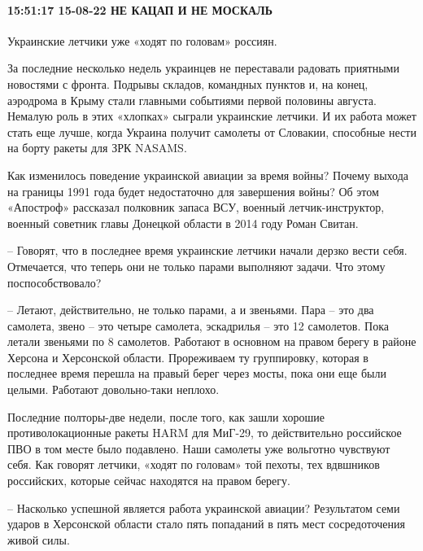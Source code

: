  
 
 
 
 

\paragraph{15:51:17 15-08-22 НЕ КАЦАП И НЕ МОСКАЛЬ}

Украинские летчики уже «ходят по головам» россиян.

За последние несколько недель украинцев не переставали радовать приятными
новостями с фронта. Подрывы складов, командных пунктов и, на конец, аэродрома в
Крыму стали главными событиями первой половины августа. Немалую роль в этих
«хлопках» сыграли украинские летчики. И их работа может стать еще лучше, когда
Украина получит самолеты от Словакии, способные нести на борту ракеты для ЗРК
NASAMS.

Как изменилось поведение украинской авиации за время войны? Почему выхода на
границы 1991 года будет недостаточно для завершения войны? Об этом «Апостроф»
рассказал полковник запаса ВСУ, военный летчик-инструктор, военный советник
главы Донецкой области в 2014 году Роман Свитан.

– Говорят, что в последнее время украинские летчики начали дерзко вести себя.
Отмечается, что теперь они не только парами выполняют задачи. Что этому
поспособствовало?

– Летают, действительно, не только парами, а и звеньями. Пара – это два
самолета, звено – это четыре самолета, эскадрилья – это 12 самолетов. Пока
летали звеньями по 8 самолетов. Работают в основном на правом берегу в районе
Херсона и Херсонской области. Прореживаем ту группировку, которая в последнее
время перешла на правый берег через мосты, пока они еще были целыми. Работают
довольно-таки неплохо.

Последние полторы-две недели, после того, как зашли хорошие противолокационные
ракеты HARM для МиГ-29, то действительно российское ПВО в том месте было
подавлено. Наши самолеты уже вольготно чувствуют себя. Как говорят летчики,
«ходят по головам» той пехоты, тех вдвшников российских, которые сейчас
находятся на правом берегу.

– Насколько успешной является работа украинской авиации? Результатом семи
ударов в Херсонской области стало пять попаданий в пять мест сосредоточения
живой силы.

